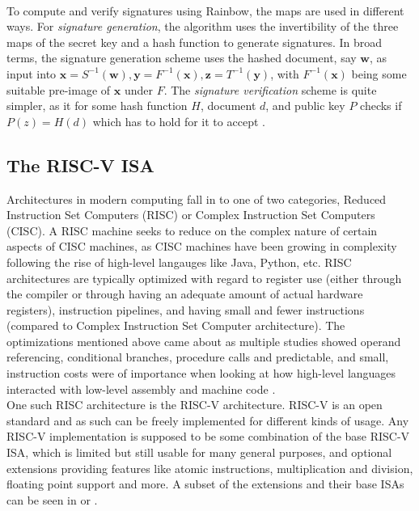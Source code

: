 \medskip\\
To compute and verify signatures using Rainbow, the maps are used in different ways.
For \textit{signature generation}, the algorithm uses the invertibility of the three maps of the secret key and a hash function to generate signatures. In broad terms, the signature generation scheme uses the hashed document, say $\mathbf{w}$, as input into $\mathbf{x} = S^{-1}(\mathbf{w}), \mathbf{y} = F^{-1}(\mathbf{x}), \mathbf{z} = T^{-1}(\mathbf{y})$, with $F^{-1}(\mathbf{x})$ being some suitable pre-image of $\mathbf{x}$ under $F$. The \textit{signature verification} scheme is quite simpler, as it for some hash function $H$, document $d$, and public key $P$ checks if $P(z) = H(d)$ which has to hold for it to accept \cite{multicrypto}.

\subsection{The RISC-V ISA} \label{pre-riscv}
Architectures in modern computing fall in to one of two categories, Reduced Instruction Set Computers (RISC) or Complex Instruction Set Computers (CISC). A RISC machine seeks to reduce on the complex nature of certain aspects of CISC machines, as CISC machines have been growing in complexity following the rise of high-level langauges like Java, Python, etc. RISC architectures are typically optimized with regard to register use (either through the compiler or through having an adequate amount of actual hardware registers), instruction pipelines, and having small and fewer instructions (compared to Complex Instruction Set Computer architecture). The optimizations mentioned above came about as multiple studies showed operand referencing, conditional branches, procedure calls and predictable, and small, instruction costs were of importance when looking at how high-level languages interacted with low-level assembly and machine code \cite{stallings}.
\medskip\\
One such RISC architecture is the RISC-V architecture. RISC-V is an open standard and as such can be freely implemented for different kinds of usage. Any RISC-V implementation is supposed to be some combination of the base RISC-V ISA, which is limited but still usable for many general purposes, and optional extensions providing features like atomic instructions, multiplication and division, floating point support and more. A subset of the extensions and their base ISAs can be seen in \cite{riscvmodular} or \cite{riscdesign}.
\medskip\\
